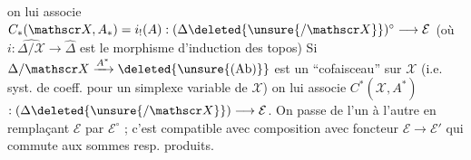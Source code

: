 on lui associe $C_*(\mathscr X,A_*)=i_{!}(A):(\Delta\deleted{\unsure{/\mathscr X}})^\circ\longrightarrow\mathcal E$ (où $i:\widehat{\Delta/\mathscr X}\longrightarrow\widehat{\Delta}$ est le morphisme d'induction des topos)
Si $\Delta/\mathscr X\xrightarrow{A^*}\deleted{\unsure{(\mathrm{Ab})}}$ est un ``cofaisceau'' sur $\mathscr X$ (i.e. syst. de coeff.  pour un simplexe variable de $\mathscr X$) on lui associe $C^*(\mathscr X,A^*)$  $:(\Delta\deleted{\unsure{/\mathscr X}})\longrightarrow\mathcal E$.
On passe de l'un à l'autre en remplaçant $\mathcal E$ par $\mathcal E^{\circ}$ ; c'est compatible avec composition avec foncteur $\mathcal E\longrightarrow\mathcal E'$ qui commute aux sommes resp. produits.

